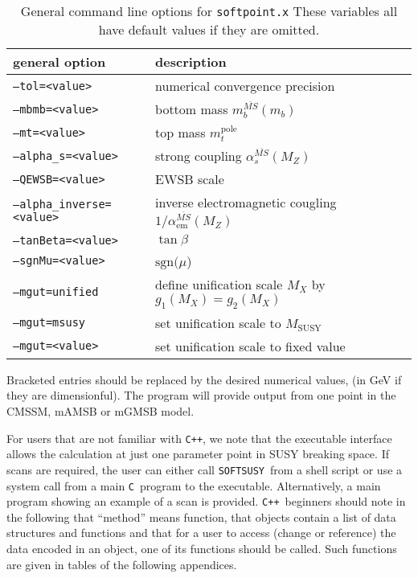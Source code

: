 \documentclass[]{article}
\def\SOFTSUSY{{\tt SOFTSUSY}}
\def\code#1{\small{\tt #1}\normalsize}
\begin{document}
\begin{table}[tbh]
  \centering
  \begin{tabular}{ll}
    general option & description \\
    \hline
    \code{--tol=<value>} & numerical convergence precision \\
    \code{--mbmb=<value>} & bottom mass $m_b^{\overline{MS}}(m_b)$ \\
    \code{--mt=<value>} & top mass $m_t^\text{pole}$ \\
    \code{--alpha\_s=<value>} & strong coupling $\alpha_s^{\overline{MS}}(M_Z)$ \\
    \code{--QEWSB=<value>} & EWSB scale \\
    \code{--alpha\_inverse=<value>} & inverse electromagnetic cougling
    $1/\alpha^{\overline{MS}}_\text{em}(M_Z)$ \\
    \code{--tanBeta=<value>} & $\tan\beta$ \\
    \code{--sgnMu=<value>} & $\text{sgn}(\mu$) \\
    \code{--mgut=unified} & define unification scale $M_X$ by $g_1(M_X)=g_2(M_X)$ \\
    \code{--mgut=msusy} & set unification scale to $M_\text{SUSY}$ \\
    \code{--mgut=<value>} & set unification scale to fixed value \\
    \hline
  \end{tabular}
  \caption{General command line options for \code{softpoint.x} These variables
    all have  default values if they are omitted.}
  \label{tab:general-cmd-line-options}
\end{table}
%
Bracketed entries should be replaced by the desired numerical values, (in GeV
if they are dimensionful). The program will provide output from one point in
the CMSSM, mAMSB or mGMSB model. 


For users that are not familiar with \code{C++}, we note that the executable
interface allows the calculation at just one parameter point in SUSY breaking 
space. If scans are required, the user can either call \SOFTSUSY~from a
shell script or use a system call from a main \code{C}~program to the
executable. Alternatively, a main program showing an example of a scan is
provided. \code{C++}~beginners should note in
the following that ``method'' means function, that objects contain a list of
data structures and functions and that for a user to access (change
or reference) the data encoded in an object, one of its functions should be
called. Such functions are given in tables of the following appendices.
\end{document}
